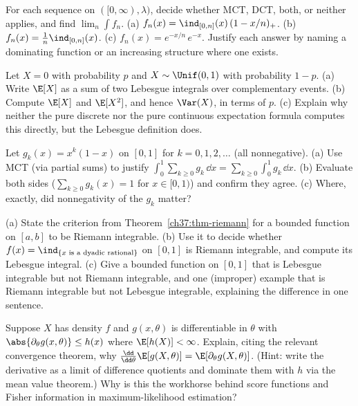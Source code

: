 \begin{exercise}
\label{ch37:ex-mctdct}
For each sequence on $([0,\infty),\lambda)$, decide whether MCT, DCT, both, or
neither applies, and find $\lim_n\int f_n$.
(a) $f_n(x)=\ind_{[0,n]}(x)\,(1-x/n)_+$.
(b) $f_n(x)=\frac{1}{n}\ind_{[0,n]}(x)$.
(c) $f_n(x)=e^{-x/n}\,e^{-x}$.
Justify each answer by naming a dominating function or an increasing structure
where one exists.
\end{exercise}

\begin{exercise}
\label{ch37:ex-mixed}
Let $X=0$ with probability $p$ and $X\sim\Unif(0,1)$ with probability $1-p$.
(a) Write $\E[X]$ as a sum of two Lebesgue integrals over complementary events.
(b) Compute $\E[X]$ and $\E[X^2]$, and hence $\Var(X)$, in terms of $p$.
(c) Explain why neither the pure discrete nor the pure continuous expectation
formula computes this directly, but the Lebesgue definition does.
\end{exercise}

\begin{exercise}
\label{ch37:ex-termbyterm}
Let $g_k(x)=x^{k}(1-x)$ on $[0,1]$ for $k=0,1,2,\dots$ (all nonnegative).
(a) Use MCT (via partial sums) to justify $\int_0^1 \sum_{k\ge0} g_k\,\dd x
= \sum_{k\ge0}\int_0^1 g_k\,\dd x$. (b) Evaluate both sides
($\sum_{k\ge0} g_k(x)=1$ for $x\in[0,1)$) and confirm they agree. (c) Where,
exactly, did nonnegativity of the $g_k$ matter?
\end{exercise}

\begin{exercise}
\label{ch37:ex-riemann}
(a) State the criterion from Theorem~\ref{ch37:thm-riemann} for a bounded
function on $[a,b]$ to be Riemann integrable. (b) Use it to decide whether
$f(x)=\ind_{\{x \text{ is a dyadic rational}\}}$ on $[0,1]$ is Riemann
integrable, and compute its Lebesgue integral. (c) Give a bounded function on
$[0,1]$ that is Lebesgue integrable but not Riemann integrable, and one
(improper) example that is Riemann integrable but not Lebesgue integrable,
explaining the difference in one sentence.
\end{exercise}

\begin{exercise}
\label{ch37:ex-diffunder}
Suppose $X$ has density $f$ and $g(x,\theta)$ is differentiable in $\theta$ with
$\abs{\partial_\theta g(x,\theta)}\le h(x)$ where $\E[h(X)]<\infty$. Explain,
citing the relevant convergence theorem, why
$\frac{\dd}{\dd\theta}\E[g(X,\theta)]=\E[\partial_\theta g(X,\theta)]$. (Hint:
write the derivative as a limit of difference quotients and dominate them with
$h$ via the mean value theorem.) Why is this the workhorse behind score
functions and Fisher information in maximum-likelihood estimation?
\end{exercise}
